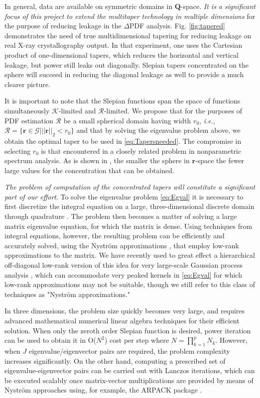 In general, data are available on symmetric domains in $\mathbf{Q}$-space. \textit{It
is a significant focus of this project to extend the multitaper technology in
multiple dimensions} for the purpose of reducing leakage in the $\Delta$PDF analysis.
Fig. \ref{fig:tapered} demonstrates the need of true multidimensional tapering for
reducing leakage on real X-ray crystallography output. In that experiment, one uses
the Cartesian product of one-dimensional tapers, which reduces the horizontal and
vertical leakage, but power still leaks out diagonally. Slepian tapers concentrated
on the sphere will succeed in reducing the diagonal leakage as well to provide a much
clearer picture. 

It is important to note that the Slepian functions span the space of functions
simultaneously $\mathcal{K}$-limited and $\mathcal{R}$-limited. We propose that for
the purposes of PDF estimation $\mathcal{R}$ be a small spherical domain having width
$r_0$, \textit{i.e.}, $\mathcal{R} = \{\mathbf{r} \in \mathcal{G} | ||\mathbf{r}||_2
< r_0\}$ and that by solving the eigenvalue problem above, we obtain the optimal
taper to be used in \eqref{eq:Tapersneeded}. The compromise in selecting $r_0$ is
that encountered in a closely related problem in nonparametric spectrum analysis. As
is shown in \cite{simons2011}, the smaller the sphere in $\mathbf{r}$-space the fewer
large values for the concentration that can be obtained. 

\textit{The problem of computation of the concentrated tapers will constitute a
significant part of our effort}. To solve the eigenvalue problem \eqref{eq:Egval} it
is necessary to first discretize the integral equation on a large, three-dimensional
discrete domain through quadrature \cite{press1992}. The problem then becomes a
matter of solving a large matrix eigenvalue equation, for which the matrix is dense.
Using techniques from integral equations, however, the resulting problem can be
efficiently and accurately solved, using the Nyström approximations
\cite{nystrom1930,atkinson2005theoretical}, that employ low-rank approximations to
the matrix. We have recently used to great effect a hierarchical off-diagonal
low-rank version of this idea for very large-scale Gaussian process analysis
\cite{geoga2018scalable}, which can accommodate very peaked kernels in
\eqref{eq:Egval}  for which low-rank approximations may not be suitable, though we
still refer to this class of techniques as "Nyström approximations."

In three dimensions, the problem size quickly becomes very large, and requires
advanced mathematical numerical linear algebra techniques for their efficient
solution. When only the zeroth order Slepian function is desired, power iteration can
be used to obtain it in O($N^2$) cost per step where $N = \prod_{k = 1}^p N_k$.
However, when $J$ eigenvalue/eigenvector pairs are required, the problem complexity
increases significantly. On the other hand, computing a prescribed set of
eigenvalue-eigenvector pairs can be carried out with Lanczos iterations, which can be
executed scalably once matrix-vector multiplications are provided by means of Nyström
approaches using, for example, the ARPACK package \cite{lehoucq1998arpack}. 

